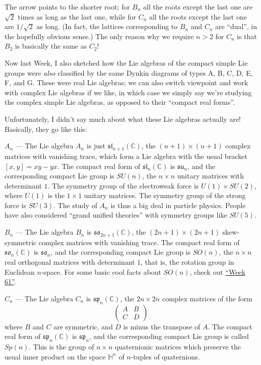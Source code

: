 \documentclass{article}
\begin{document}
The arrow points to the shorter root; for \(B_n\) all the roots except
the last one are \(\sqrt{2}\) times as long as the last one, while for
\(C_n\) all the roots except the last one are \(1/\sqrt{2}\) as long.
(In fact, the lattices corresponding to \(B_n\) and \(C_n\) are
``dual'', in the hopefully obvious sense.) The only reason why we
require \(n > 2\) for \(C_n\) is that \(B_2\) is basically the same as
\(C_2\)!

Now last Week, I also sketched how the Lie algebras of the compact
simple Lie groups were \emph{also} classified by the same Dynkin
diagrams of types A, B, C, D, E, F, and G. These were real Lie algebras;
we can also switch viewpoint and work with complex Lie algebras if we
like, in which case we simply say we're studying the complex simple Lie
algebras, as opposed to their ``compact real forms''.

Unfortunately, I didn't say much about what these Lie algebras actually
are! Basically, they go like this:

\(A_n\) --- The Lie algebra \(A_n\) is just
\(\mathfrak{sl}_{n+1}(\mathbb{C})\), the \((n+1) \times (n+1)\) complex
matrices with vanishing trace, which form a Lie algebra with the usual
bracket \([x,y] = xy -yx\). The compact real form of
\(\mathfrak{sl}_n(\mathbb{C})\) is \(\mathfrak{su}_n\), and the
corresponding compact Lie group is \(SU(n)\), the \(n\times n\) unitary
matrices with determinant \(1\). The symmetry group of the electroweak
force is \(U(1) \times SU(2)\), where \(U(1)\) is the \(1 \times 1\)
unitary matrices. The symmetry group of the strong force is \(SU(3)\).
The study of \(A_n\) is thus a big deal in particle physics. People have
also considered ``grand unified theories'' with symmetry groups like
\(SU(5)\).

\(B_n\) --- The Lie algebra \(B_n\) is
\(\mathfrak{so}_{2n+1}(\mathbb{C})\), the \((2n+1) \times (2n+1)\)
skew-symmetric complex matrices with vanishing trace. The compact real
form of \(\mathfrak{so}_n(\mathbb{C})\) is \(\mathfrak{so}_n\), and the
corresponding compact Lie group is \(SO(n)\), the \(n \times n\) real
orthogonal matrices with determinant \(1\), that is, the rotation group
in Euclidean \(n\)-space. For some basic cool facts about \(SO(n)\),
check out \protect\hyperlink{week61}{``Week 61''}.

\(C_n\) --- The Lie algebra \(C_n\) is \(\mathfrak{sp}_n(\mathbb{C})\),
the \(2n \times 2n\) complex matrices of the form \[
  \left(
    \begin{array}{cc}
      A&B\\C&D
    \end{array}
  \right)
\] where \(B\) and \(C\) are symmetric, and \(D\) is minus the transpose
of \(A\). The compact real form of \(\mathfrak{sp}_n(\mathbb{C})\) is
\(\mathfrak{sp}_n\), and the corresponding compact Lie group is called
\(Sp(n)\). This is the group of \(n \times n\) quaternionic matrices
which preserve the usual inner product on the space \(\mathbb{H}^n\) of
\(n\)-tuples of quaternions.
\end{document}
